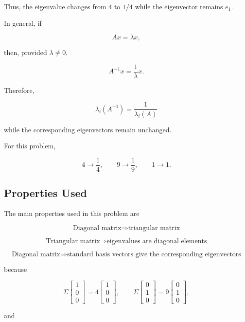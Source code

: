 \documentclass[12pt]{article}
\begin{document}
	Thus, the eigenvalue changes from $4$ to $1/4$ while the
	eigenvector remains $e_1$.
	
	In general, if
	
	\[
	Ax=\lambda x,
	\]
	
	then, provided $\lambda\neq0$,
	
	\[
	A^{-1}x=\frac{1}{\lambda}x.
	\]
	
	Therefore,
	
	\[
	\boxed{
		\lambda_i(A^{-1})
		=
		\frac{1}{\lambda_i(A)}
	}
	\]
	
	while the corresponding eigenvectors remain unchanged.
	
	For this problem,
	
	\[
	4\longrightarrow\frac14,
	\qquad
	9\longrightarrow\frac19,
	\qquad
	1\longrightarrow1.
	\]
	
	\subsection*{Properties Used}
	
	The main properties used in this problem are
	
	\[
	\boxed{
		\text{Diagonal matrix}
		\Rightarrow
		\text{triangular matrix}
	}
	\]
	
	\[
	\boxed{
		\text{Triangular matrix}
		\Rightarrow
		\text{eigenvalues are diagonal elements}
	}
	\]
	
	\[
	\boxed{
		\text{Diagonal matrix}
		\Rightarrow
		\text{standard basis vectors give the corresponding eigenvectors}
	}
	\]
	
	because
	
	\[
	\Sigma
	\begin{bmatrix}
		1\\0\\0
	\end{bmatrix}
	=
	4
	\begin{bmatrix}
		1\\0\\0
	\end{bmatrix},
	\qquad
	\Sigma
	\begin{bmatrix}
		0\\1\\0
	\end{bmatrix}
	=
	9
	\begin{bmatrix}
		0\\1\\0
	\end{bmatrix},
	\]
	
	and
	
\end{document}
